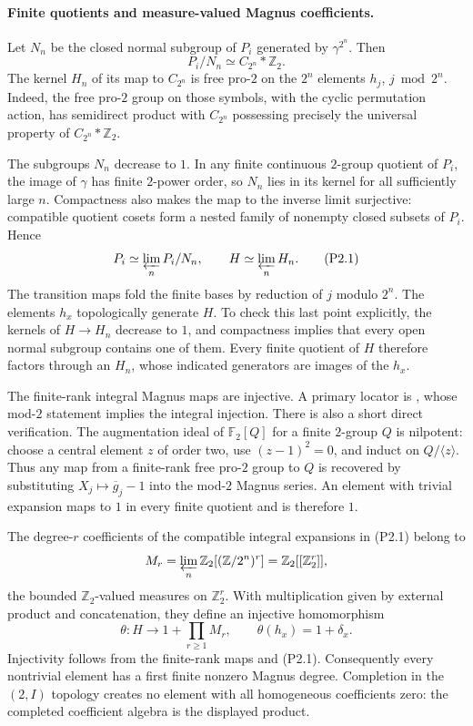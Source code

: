 \documentclass[11pt,a4paper]{article}
\theoremstyle{definition}
\begin{document}
\paragraph{Finite quotients and measure-valued Magnus coefficients.}
Let $N_n$ be the closed normal subgroup of $P_i$ generated by $\gamma^{2^n}$. Then
\[
 P_i/N_n\simeq C_{2^n}*\mathbb Z_2.
\]
The kernel $H_n$ of its map to $C_{2^n}$ is free pro-$2$ on the $2^n$ elements $h_j$, $j\bmod2^n$. Indeed, the free pro-$2$ group on those symbols, with the cyclic permutation action, has semidirect product with $C_{2^n}$ possessing precisely the universal property of $C_{2^n}*\mathbb Z_2$.

The subgroups $N_n$ decrease to $1$. In any finite continuous $2$-group quotient of $P_i$, the image of $\gamma$ has finite $2$-power order, so $N_n$ lies in its kernel for all sufficiently large $n$. Compactness also makes the map to the inverse limit surjective: compatible quotient cosets form a nested family of nonempty closed subsets of $P_i$. Hence
\[
 P_i\simeq\varprojlim_nP_i/N_n,
 \qquad
 H\simeq\varprojlim_nH_n.                                  \tag{P2.1}
\]
The transition maps fold the finite bases by reduction of $j$ modulo $2^n$. The elements $h_x$ topologically generate $H$. To check this last point explicitly, the kernels of $H\to H_n$ decrease to $1$, and compactness implies that every open normal subgroup contains one of them. Every finite quotient of $H$ therefore factors through an $H_n$, whose indicated generators are images of the $h_x$.

The finite-rank integral Magnus maps are injective. A primary locator is \cite[\S5.1, p.~21, (5.1)]{MinacPasiniQuadrelliTan2020}, whose mod-$2$ statement implies the integral injection. There is also a short direct verification. The augmentation ideal of $\mathbb F_2[Q]$ for a finite $2$-group $Q$ is nilpotent: choose a central element $z$ of order two, use $(z-1)^2=0$, and induct on $Q/\langle z\rangle$. Thus any map from a finite-rank free pro-$2$ group to $Q$ is recovered by substituting $X_j\mapsto\overline g_j-1$ into the mod-$2$ Magnus series. An element with trivial expansion maps to $1$ in every finite quotient and is therefore $1$.

The degree-$r$ coefficients of the compatible integral expansions in (P2.1) belong to
\[
 M_r=\varprojlim_n\mathbb Z_2[(\mathbb Z/2^n)^r]
     =\mathbb Z_2[[\mathbb Z_2^r]],
\]
the bounded $\mathbb Z_2$-valued measures on $\mathbb Z_2^r$. With multiplication given by external product and concatenation, they define an injective homomorphism
\[
 \theta:H\longrightarrow1+\prod_{r\geq1}M_r,
 \qquad \theta(h_x)=1+\delta_x.                             \tag{P2.2}
\]
Injectivity follows from the finite-rank maps and (P2.1). Consequently every nontrivial element has a first finite nonzero Magnus degree. Completion in the $(2,I)$ topology creates no element with all homogeneous coefficients zero: the completed coefficient algebra is the displayed product.
\end{document}
